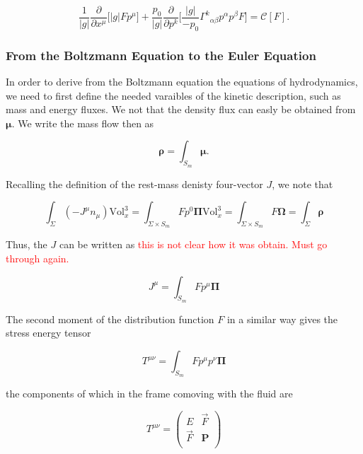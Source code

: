 \documentclass[11pt,a4paper,headinclude=true,DIV=14,BCOR=8mm,chapterprefix,listof=totoc,twoside,openright,abstracton]{scrbook}
\begin{document}
\begin{equation}
    \frac{1}{|g|}\frac{\partial}{\partial x^{\mu}}\Bigg[|g|Fp^{\mu}\Bigg] + \frac{p_0}{|g|}\frac{\partial}{\partial p^{k}}\Bigg[\frac{|g|}{-p_0}{\Gamma^k}_{\alpha\beta}p^{\alpha}p^{\beta}F\Bigg] = \mathcal{C}[F].
\end{equation}

\subsubsection{From the Boltzmann Equation to the Euler Equation}

In order to derive from the Boltzmann equation the equations of hydrodynamics, we need to first define the needed varaibles of the kinetic description, such as mass and energy fluxes. We not that the density flux can easly be obtained from $\boldsymbol{\mu}$. We write the mass flow then as 

\begin{equation}
    \boldsymbol{\rho} = \int_{S_m} \boldsymbol{\mu}.
\end{equation}

Recalling the definition of the rest-mass denisty four-vector $J$, we note that

\begin{equation}
    \int_{\Sigma}(-J^{\mu}n_{\mu})\text{Vol}_x ^3 = \int_{\Sigma\times S_{m}} Fp^0\boldsymbol{\Pi}\text{Vol}_x ^3 = \int_{\Sigma\times S_{m}} F\boldsymbol{\Omega} = \int_{\Sigma}\boldsymbol{\rho}
\end{equation}

Thus, the $J$ can be written as 
\textcolor{red}{this is not clear how it was obtain. Must go through again.}

\begin{equation}
J^{\mu} = \int_{S_m}Fp^{\mu}\boldsymbol{\Pi}
\end{equation}

The second moment of the distribution function $F$ in a similar way gives the stress energy tensor 

\begin{equation}
    T^{\mu\nu} = \int_{S_m} F p^{\mu}p^{\nu}\boldsymbol{\Pi}
\end{equation}

the components of which in the frame comoving with the fluid are

\begin{equation}
    T^{\mu\nu} = 
    \begin{pmatrix}
    E & \vec{F} \\
    \vec{F} & \boldsymbol{P} \\
    \end{pmatrix}
\end{equation}
\end{document}
